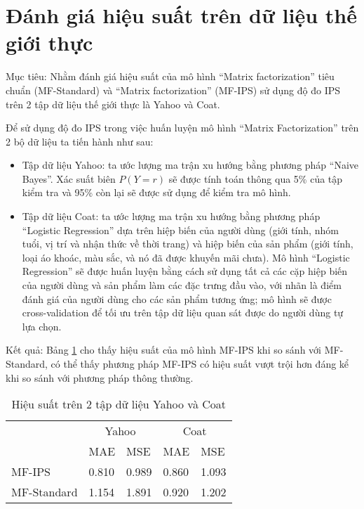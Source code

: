 \section{Đánh giá hiệu suất trên dữ liệu thế giới thực}
\label{sec:4_performance}
Mục tiêu: Nhằm đánh giá hiệu suất của mô hình ``Matrix factorization'' tiêu chuẩn (MF-Standard) và ``Matrix factorization'' (MF-IPS) sử dụng độ đo IPS trên 2 tập dữ liệu thế giới thực là Yahoo và Coat.

Để sử dụng độ đo IPS trong việc huấn luyện mô hình ``Matrix Factorization'' trên 2 bộ dữ liệu ta tiến hành như sau:
\begin{itemize}
    \item Tập dữ liệu Yahoo: ta ước lượng ma trận xu hướng bằng phương pháp ``Naive Bayes''. Xác suất biên $P(Y=r)$ sẽ được tính toán thông qua 5\% của tập kiểm tra và 95\% còn lại sẽ được sử dụng để kiểm tra mô hình.
    \item Tập dữ liệu Coat: ta ước lượng ma trận xu hướng bằng phương pháp ``Logistic Regression'' dựa trên hiệp biến của người dùng (giới tính, nhóm tuổi, vị trí và nhận thức về thời trang) và hiệp biến của sản phẩm (giới tính, loại áo khoác, màu sắc, và nó đã được khuyến mãi chưa). Mô hình ``Logistic Regression'' sẽ được huấn luyện bằng cách sử dụng tất cả các cặp hiệp biến của người dùng và sản phẩm làm các đặc trưng đầu vào, với nhãn là điểm đánh giá của người dùng cho các sản phẩm tương ứng; mô hình sẽ được cross-validation để tối ưu trên tập dữ liệu quan sát được do người dùng tự lựa chọn.
\end{itemize}

Kết quả: Bảng \ref{tab:4_performance} cho thấy hiệu suất của mô hình MF-IPS khi so sánh với MF-Standard, có thể thấy phương pháp MF-IPS có hiệu suất vượt trội hơn đáng kể khi so sánh với phương pháp thông thường.

\begin{table}[h]
    \centering
    \begin{tabular}{|l|ll|ll|}
    \hline
    \multirow{2}{*}{} & \multicolumn{2}{c|}{Yahoo} & \multicolumn{2}{c|}{Coat} \\ \cline{2-5} 
     & \multicolumn{1}{l|}{MAE} & MSE & \multicolumn{1}{l|}{MAE} & MSE \\ \hline
    MF-IPS & \multicolumn{1}{l|}{0.810} & 0.989 & \multicolumn{1}{l|}{0.860} & 1.093 \\ \hline
    MF-Standard & \multicolumn{1}{l|}{1.154} & 1.891 & \multicolumn{1}{l|}{0.920} & 1.202 \\ \hline
    \end{tabular}
    \caption{Hiệu suất trên 2 tập dữ liệu Yahoo và Coat}
    \label{tab:4_performance}
\end{table}

